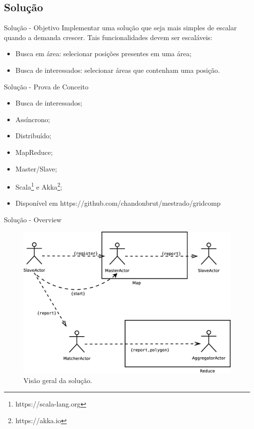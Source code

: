 \documentclass{beamer}
\begin{document}
	\subsection{Solução}
		\begin{frame}{Solução - Objetivo}
			Implementar uma solução que seja mais simples de escalar quando a demanda crescer. Tais funcionalidades devem ser escaláveis:
			\begin{itemize}
				\item Busca em área: selecionar posições presentes em uma área;
				\item Busca de interessados: selecionar áreas que contenham uma posição.
			\end{itemize}
		\end{frame}

		\begin{frame}{Solução - Prova de Conceito}
			\begin{itemize}
				\item Busca de interessados;
				\item Assíncrono;
				\item Distribuído;
				\item MapReduce;
				\item Master/Slave;
				\item Scala\footnote{https://scala-lang.org} e Akka\footnote{https://akka.io};
				\item Disponível em https://github.com/chandonbrut/mestrado/gridcomp
			\end{itemize}
		\end{frame}

		\begin{frame}{Solução - Overview}
			\begin{figure}[H]
				\includegraphics[scale=0.17]{img/actors_overview.eps}
				\caption{Visão geral da solução.}
				\label{fig:actors_overview}
			\end{figure}
		\end{frame}
		
\end{document}
